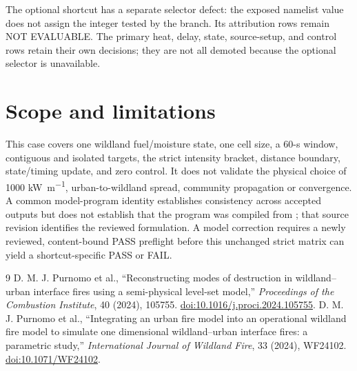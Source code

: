 The optional shortcut has a separate selector defect: the exposed namelist
value does not assign the integer tested by the branch. Its attribution rows
remain NOT EVALUABLE. The primary heat, delay, state, source-setup, and control
rows retain their own decisions; they are not all demoted because the optional
selector is unavailable.

\section{Scope and limitations}

This case covers one wildland fuel/moisture state, one cell size, a 60-s window,
contiguous and isolated targets, the strict intensity bracket, distance
boundary, state/timing update, and zero control.  It does not validate the
physical choice of 1000 \si{\kilo\watt\per\metre}, urban-to-wildland spread,
community propagation or convergence. A common model-program identity
establishes consistency across accepted outputs but does not establish that
the program was compiled from \SourceCommit; that source revision identifies
the reviewed formulation. A model correction requires a newly reviewed,
content-bound PASS preflight before this unchanged strict matrix can yield a
shortcut-specific PASS or FAIL.

\begin{thebibliography}{9}
 D. M. J. Purnomo et al., ``Reconstructing modes of destruction in wildland--urban interface fires using a semi-physical level-set model,'' \emph{Proceedings of the Combustion Institute}, 40 (2024), 105755. \href{https://doi.org/10.1016/j.proci.2024.105755}{doi:10.1016/j.proci.2024.105755}.
 D. M. J. Purnomo et al., ``Integrating an urban fire model into an operational wildland fire model to simulate one dimensional wildland--urban interface fires: a parametric study,'' \emph{International Journal of Wildland Fire}, 33 (2024), WF24102. \href{https://doi.org/10.1071/WF24102}{doi:10.1071/WF24102}.
\end{thebibliography}
